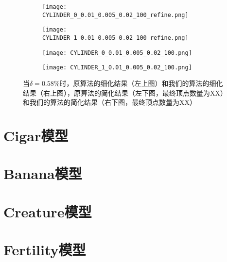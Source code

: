 \begin{figure}[htbp]
  \centering
  \begin{subfigure}[b]{0.4\textwidth}
    \texttt{[image: CYLINDER\_0\_0.01\_0.005\_0.02\_100\_refine.png]}
  \end{subfigure}
  \begin{subfigure}[b]{0.4\textwidth}
    \texttt{[image: CYLINDER\_1\_0.01\_0.005\_0.02\_100\_refine.png]}
  \end{subfigure}
  \begin{subfigure}[b]{0.4\textwidth}
    \texttt{[image: CYLINDER\_0\_0.01\_0.005\_0.02\_100.png]}
  \end{subfigure}
  \begin{subfigure}[b]{0.4\textwidth}
    \texttt{[image: CYLINDER\_1\_0.01\_0.005\_0.02\_100.png]}
  \end{subfigure}
  \caption[当$\delta=0.29\%$时Cylinder结果对比]{当$\delta=0.58\%$时，原算法的细化结果（左上图）和我们的算法的细化结果（右上图），原算法的简化结果（左下图，最终顶点数量为XX）和我们的算法的简化结果（右下图，最终顶点数量为XX）}
  \label{fig:cylinder-res2}
\end{figure}


\section{Cigar模型}

\section{Banana模型}

\section{Creature模型}

\section{Fertility模型}
